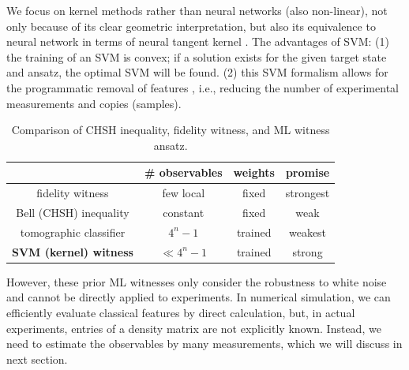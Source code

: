 \documentclass[
aps,
pra,
twocolumn,
floatfix,
]{revtex4-2}
\theoremstyle{plain}
\theoremstyle{definition}
\begin{document}
We focus on kernel methods rather than neural networks (also non-linear), 
not only because of its clear geometric interpretation, but also its equivalence to neural network in terms of neural tangent kernel \cite{jacotNeuralTangentKernel2020}.
The advantages of SVM: (1) the training of an SVM is convex; if a solution exists for the given target state and ansatz, the optimal SVM will be found.
(2) this SVM formalism allows for the programmatic removal of features \cite{guyonGeneSelectionCancer2002}, i.e., reducing the number of experimental measurements and copies (samples). 


\begin{table}[!ht]
	\centering
	\begin{tabular}{c|c|c|c}
		& \# observables & weights & promise \\
		\hline
		fidelity  witness & few local & fixed & strongest  \\  
		Bell (CHSH) inequality & constant & fixed & weak \\  
		tomographic classifier & $4^n-1$ & trained & weakest \\  
		\textbf{SVM (kernel) witness} &  $\ll 4^n-1$ & trained & strong \\  
		\hline
	\end{tabular}
	\caption{Comparison of CHSH inequality, fidelity witness, and ML witness ansatz.}
\end{table}

However, these prior ML witnesses only consider the robustness to white noise and cannot be directly applied to experiments.
In numerical simulation, we can efficiently evaluate classical features by direct calculation, 
but, in actual experiments, entries of a density matrix are not explicitly known.
Instead, we need to estimate the observables by many measurements, which we will discuss in next section.
\end{document}
